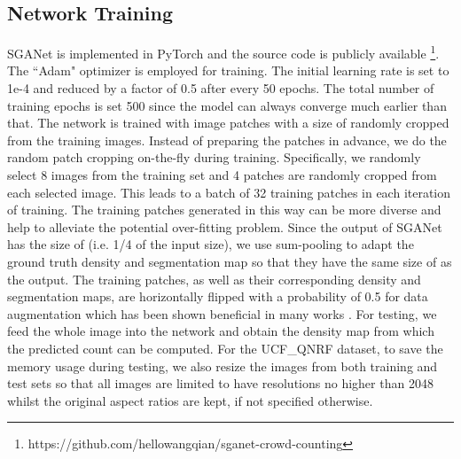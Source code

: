 \documentclass[journal,comsoc]{IEEEtran}
\begin{document}
\subsection{Network Training}
SGANet is implemented in PyTorch \cite{paszke2017automatic} and the source code is publicly available \footnote{https://github.com/hellowangqian/sganet-crowd-counting}. The ``Adam" optimizer \cite{kingma2014adam} is employed for training. The initial learning rate is set to 1e-4 and reduced by a factor of 0.5 after every 50 epochs. The total number of training epochs is set 500 since the model can always converge much earlier than that. The network is trained with image patches with a size of  randomly cropped from the training images. Instead of preparing the patches in advance, we do the random patch cropping on-the-fly during training. Specifically, we randomly select 8 images from the training set and 4 patches are randomly cropped from each selected image. This leads to a batch of 32 training patches in each iteration of training. The training patches generated in this way can be more diverse and help to alleviate the potential over-fitting problem. Since the output of SGANet has the size of  (i.e. 1/4 of the input size), we use sum-pooling to adapt the ground truth density and segmentation map so that they have the same size of  as the output. The training patches, as well as their corresponding density and segmentation maps, are horizontally flipped with a probability of 0.5 for data augmentation which has been shown beneficial in many works \cite{guo2019dadnet,zhang2019relational}. For testing, we feed the whole image into the network and obtain the density map from which the predicted count can be computed. For the UCF\_QNRF dataset, to save the memory usage during testing, we also resize the images from both training and test sets so that all images are limited to have resolutions no higher than 2048 whilst the original aspect ratios are kept, if not specified otherwise.
\end{document}
